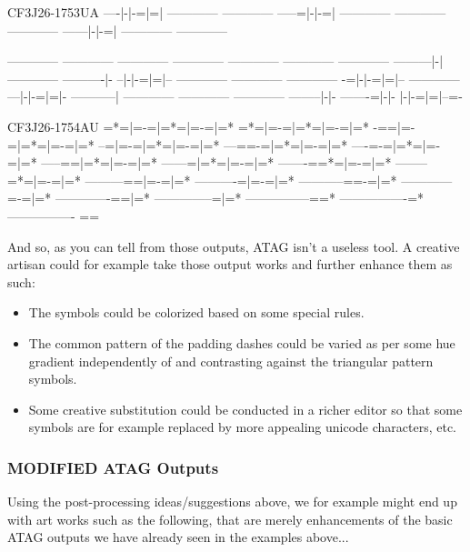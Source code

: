 \documentclass[a4paper, 18pt]{book} %
\begin{document}
{{{\newpage


 \begin{tcbverbatim}[title=Sample OUTPUT 6 from ATAG v2]
CF3J26-1753UA
----|-|-=|=|
------------
------------
-----=|-|-=|
------------
------------
------------
------|-|-=|
------------
------------

------------
------------
------------
------------
------------
------------
------------
---------|-|
------------
----------|-
--|-|-=|=|--
------------
------------
------------
-=|-|-=|=|--
------------
---|-|-=|=|-
-----------|
------------
------------
------------
--------|-|-
-------=|-|-
|-|-=|=|--=-
  \end{tcbverbatim}
  

\newpage


 \begin{tcbverbatim}[title=Sample OUTPUT 7 from ATAG v2]
CF3J26-1754AU
=*=|=-=|=*=|=-=|=*
=*=|=-=|=*=|=-=|=*
-==|=-=|=*=|=-=|=*
--=|=-=|=*=|=-=|=*
---==-=|=*=|=-=|=*
----=-=|=*=|=-=|=*
-----==|=*=|=-=|=*
------=|=*=|=-=|=*
-------==*=|=-=|=*
--------=*=|=-=|=*
---------==|=-=|=*
----------=|=-=|=*
-----------==-=|=*
------------=-=|=*
-------------==|=*
--------------=|=*
---------------==*
----------------=*
----------------
==
  \end{tcbverbatim}
  
  
 And so, as you can tell from those outputs, ATAG isn't a useless tool. A creative artisan could for example take those output works and further enhance them as such:
 
 \begin{itemize}
 \item The symbols could be colorized based on some special rules.
 \item The common pattern of the padding dashes could be varied as per some hue gradient independently of and contrasting against the triangular pattern symbols.
 \item Some creative substitution could be conducted in a richer editor so that some symbols are for example replaced by more appealing unicode characters, etc.
 \end{itemize}
 
 \subsubsection{MODIFIED ATAG Outputs}
 
 Using the post-processing ideas/suggestions above, we for example might end up with art works such as the following, that are merely enhancements of the basic ATAG outputs we have already seen in the examples above...
 
}}}
\end{document}
